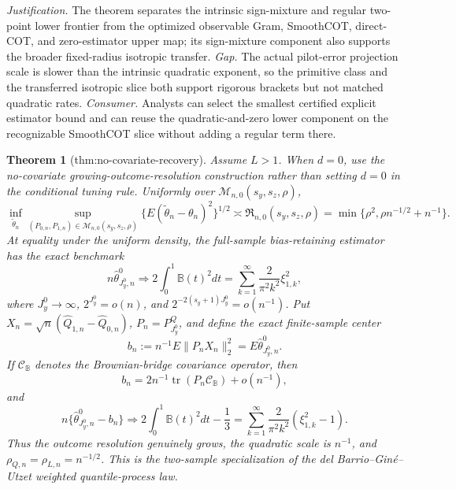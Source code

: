 \documentclass{article}
\newtheorem{theorem}{Theorem}
\begin{document}
\par\smallskip\noindent \textit{Justification.} The theorem separates the intrinsic sign-mixture and regular two-point lower frontier from the optimized observable Gram, SmoothCOT, direct-COT, and zero-estimator upper map; its sign-mixture component also supports the broader fixed-radius isotropic transfer. \textit{Gap.} The actual pilot-error projection scale is slower than the intrinsic quadratic exponent, so the primitive class and the transferred isotropic slice both support rigorous brackets but not matched quadratic rates. \textit{Consumer.} Analysts can select the smallest certified explicit estimator bound and can reuse the quadratic-and-zero lower component on the recognizable SmoothCOT slice without adding a regular term there.

\begin{theorem}[thm:no-covariate-recovery]\label{thm:no-covariate-recovery}
Assume \(L>1\). When \(d=0\), use the no-covariate growing-outcome-resolution construction rather than setting \(d=0\) in the conditional tuning rule. Uniformly over \(\mathcal M_{n,0}(s_y,s_z,\rho)\),
\[
\inf_{\widetilde\theta_n}\sup_{(P_{0,n},P_{1,n})\in\mathcal M_{n,0}(s_y,s_z,\rho)}\{E(\widetilde\theta_n-\theta_n)^2\}^{1/2}\asymp\mathfrak R_{n,0}(s_y,s_z,\rho)=\min\{\rho^2,\rho n^{-1/2}+n^{-1}\}.
\]
At equality under the uniform density, the full-sample bias-retaining estimator has the exact benchmark
\[
n\widehat\theta^0_{J_y^0,n}\Rightarrow2\int_0^1\mathbb B(t)^2dt=\sum_{k=1}^{\infty}\frac{2}{\pi^2k^2}\xi_{1,k}^2,
\]
where \(J_y^0\to\infty\), \(2^{J_y^0}=o(n)\), and \(2^{-2(s_y+1)J_y^0}=o(n^{-1})\). Put \(X_n=\sqrt n(\widehat Q_{1,n}-\widehat Q_{0,n})\), \(P_n=P^Q_{J_y^0}\), and define the exact finite-sample center
\[
b_n:=n^{-1}E\|P_nX_n\|_2^2=E\widehat\theta^0_{J_y^0,n}.
\]
If \(\mathcal C_{\mathbb B}\) denotes the Brownian-bridge covariance operator, then
\[
b_n=2n^{-1}\operatorname{tr}(P_n\mathcal C_{\mathbb B})+o(n^{-1}),
\]
and
\[
n\{\widehat\theta^0_{J_y^0,n}-b_n\}
\Rightarrow2\int_0^1\mathbb B(t)^2dt-\frac13
=\sum_{k=1}^{\infty}\frac{2}{\pi^2k^2}(\xi_{1,k}^2-1).
\]
Thus the outcome resolution genuinely grows, the quadratic scale is \(n^{-1}\), and \(\rho_{Q,n}=\rho_{L,n}=n^{-1/2}\). This is the two-sample specialization of the del Barrio--Gin\'e--Utzet weighted quantile-process law.
\end{theorem}
\end{document}
